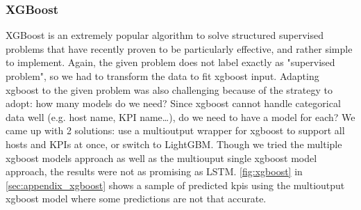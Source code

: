 \documentclass[acmsmall, screen, nonacm]{acmart}
\begin{document}
\subsubsection*{XGBoost}
XGBoost is an extremely popular algorithm to solve structured supervised problems that have recently proven to be particularly effective, and rather simple to implement.
Again, the given problem does not label exactly as "supervised problem", so we had to transform the data to fit xgboost input.
Adapting xgboost to the given problem was also challenging because of the strategy to adopt: how many models do we need? 
Since xgboost cannot handle categorical data well \cite{chen_xgboost_2016} (e.g. host name, KPI name\dots), do we need to have a model for each? 
We came up with 2 solutions: use a multioutput wrapper for xgboost to support all hosts and KPIs at once, or switch to LightGBM.
Though we tried the multiple xgboost models approach as well as the multiouput single xgboost model approach, the results were not as promising as LSTM. 
\autoref{fig:xgboost} in \autoref{sec:appendix_xgboost} shows a sample of predicted kpis using the multioutput xgboost model where some predictions are not that accurate.
\end{document}
